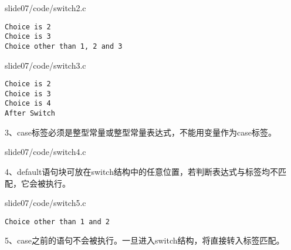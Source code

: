 \begin{frame}[fragile]\ft{\secname}
  
  {slide07/code/switch2.c}
\end{frame}

\begin{frame}[fragile]\ft{\secname}
\begin{lstlisting}[backgroundcolor=\color{blue!20}]
Choice is 2
Choice is 3
Choice other than 1, 2 and 3
\end{lstlisting}

\end{frame}

\begin{frame}[fragile]\ft{\secname}
  
  {slide07/code/switch3.c}
\end{frame}

\begin{frame}[fragile]\ft{\secname}
\begin{lstlisting}[backgroundcolor=\color{blue!20}]
Choice is 2
Choice is 3
Choice is 4
After Switch
\end{lstlisting}
\end{frame}


\begin{frame}[fragile]\ft{\secname}
3、case标签必须是整型常量或整型常量表达式，不能用变量作为case标签。
\end{frame}

\begin{frame}[fragile]\ft{\secname}
  
  {slide07/code/switch4.c}
\end{frame}

\begin{frame}[fragile]\ft{\secname}
4、default语句块可放在switch结构中的任意位置，若判断表达式与标签均不匹配，它会被执行。
\end{frame}

\begin{frame}[fragile]\ft{\secname}
  
  {slide07/code/switch5.c} \pause 
\begin{lstlisting}[backgroundcolor=\color{blue!20}]
Choice other than 1 and 2
\end{lstlisting}
\end{frame}


\begin{frame}\ft{\secname}
5、case之前的语句不会被执行。一旦进入switch结构，将直接转入标签匹配。
\end{frame}


